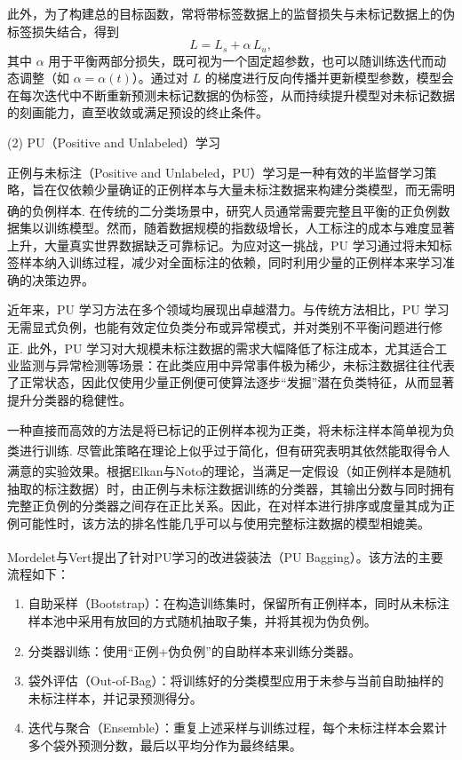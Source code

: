 此外，为了构建总的目标函数，常将带标签数据上的监督损失与未标记数据上的伪标签损失结合，得到
\begin{equation}\label{eq:2-4}
	L = L_s + \alpha \, L_u,
\end{equation}
其中 $ \alpha $ 用于平衡两部分损失，既可视为一个固定超参数，也可以随训练迭代而动态调整（如 $\alpha = \alpha(t)$）。通过对 $ L $ 的梯度进行反向传播并更新模型参数，模型会在每次迭代中不断重新预测未标记数据的伪标签，从而持续提升模型对未标记数据的刻画能力，直至收敛或满足预设的终止条件。

(2) PU（Positive and Unlabeled）学习

正例与未标注（Positive and Unlabeled，PU）学习是一种有效的半监督学习策略，旨在仅依赖少量确证的正例样本与大量未标注数据来构建分类模型，而无需明确的负例样本\textsuperscript{\cite{elkan2008learning,mordelet2013bagging}}. 在传统的二分类场景中，研究人员通常需要完整且平衡的正负例数据集以训练模型。然而，随着数据规模的指数级增长，人工标注的成本与难度显著上升，大量真实世界数据缺乏可靠标记。为应对这一挑战，PU 学习通过将未知标签样本纳入训练过程，减少对全面标注的依赖，同时利用少量的正例样本来学习准确的决策边界。

近年来，PU 学习方法在多个领域均展现出卓越潜力。与传统方法相比，PU 学习无需显式负例，也能有效定位负类分布或异常模式，并对类别不平衡问题进行修正\textsuperscript{\cite{elkan2008learning}}. 此外，PU 学习对大规模未标注数据的需求大幅降低了标注成本，尤其适合工业监测与异常检测等场景：在此类应用中异常事件极为稀少，未标注数据往往代表了正常状态，因此仅使用少量正例便可使算法逐步“发掘”潜在负类特征，从而显著提升分类器的稳健性。

一种直接而高效的方法是将已标记的正例样本视为正类，将未标注样本简单视为负类进行训练\textsuperscript{\cite{elkan2008learning}}. 尽管此策略在理论上似乎过于简化，但有研究表明其依然能取得令人满意的实验效果。根据Elkan与Noto\textsuperscript{\cite{elkan2008learning}}的理论，当满足一定假设（如正例样本是随机抽取的标注数据）时，由正例与未标注数据训练的分类器，其输出分数与同时拥有完整正负例的分类器之间存在正比关系。因此，在对样本进行排序或度量其成为正例可能性时，该方法的排名性能几乎可以与使用完整标注数据的模型相媲美。

Mordelet与Vert\textsuperscript{\cite{mordelet2013bagging}}提出了针对PU学习的改进袋装法（PU Bagging）。该方法的主要流程如下：
\begin{enumerate}
	\item 自助采样（Bootstrap）：在构造训练集时，保留所有正例样本，同时从未标注样本池中采用有放回的方式随机抽取子集，并将其视为伪负例。
	\item 分类器训练：使用“正例+伪负例”的自助样本来训练分类器。
	\item 袋外评估（Out-of-Bag）：将训练好的分类模型应用于未参与当前自助抽样的未标注样本，并记录预测得分。
	\item 迭代与聚合（Ensemble）：重复上述采样与训练过程，每个未标注样本会累计多个袋外预测分数，最后以平均分作为最终结果。
\end{enumerate}


